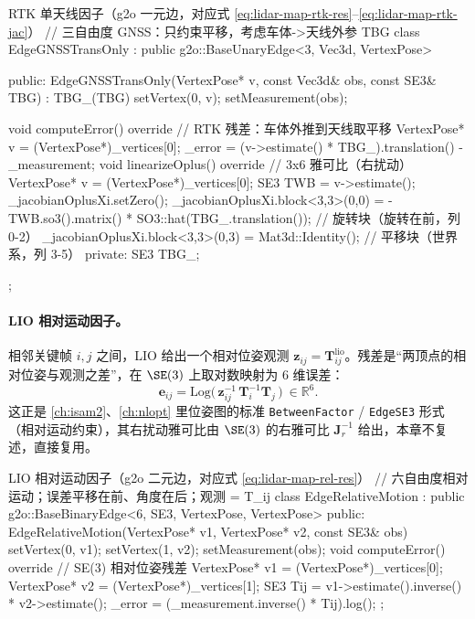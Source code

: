 \begin{codebox}[C++]{RTK 单天线因子（g2o 一元边，对应式 \ref{eq:lidar-map-rtk-res}--\ref{eq:lidar-map-rtk-jac}）}
// 三自由度 GNSS：只约束平移，考虑车体->天线外参 TBG
class EdgeGNSSTransOnly : public g2o::BaseUnaryEdge<3, Vec3d, VertexPose> {
 public:
  EdgeGNSSTransOnly(VertexPose* v, const Vec3d& obs, const SE3& TBG)
      : TBG_(TBG) { setVertex(0, v); setMeasurement(obs); }

  void computeError() override {                       // RTK 残差：车体外推到天线取平移
    VertexPose* v = (VertexPose*)_vertices[0];
    _error = (v->estimate() * TBG_).translation() - _measurement;
  }
  void linearizeOplus() override {                     // 3x6 雅可比（右扰动）
    VertexPose* v = (VertexPose*)_vertices[0];
    SE3 TWB = v->estimate();
    _jacobianOplusXi.setZero();
    _jacobianOplusXi.block<3,3>(0,0) = -TWB.so3().matrix() * SO3::hat(TBG_.translation()); // 旋转块（旋转在前，列 0-2）
    _jacobianOplusXi.block<3,3>(0,3) = Mat3d::Identity();                       // 平移块（世界系，列 3-5）
  }
 private:
  SE3 TBG_;
};
\end{codebox}

\paragraph{LIO 相对运动因子。}
相邻关键帧 $i,j$ 之间，LIO 给出一个相对位姿观测 $\mathbf{z}_{ij}=\mathbf{T}_{ij}^{\text{lio}}$。残差是“两顶点的相对位姿与观测之差”，在 $\SE(3)$ 上取对数映射为 $6$ 维误差\cite{gao2023slamad}：
\begin{equation}
\label{eq:lidar-map-rel-res}
\mathbf{e}_{ij}=\mathrm{Log}\!\Big(\,\mathbf{z}_{ij}^{-1}\,\mathbf{T}_i^{-1}\mathbf{T}_j\,\Big)\ \in\mathbb{R}^6 .
\end{equation}
这正是 \cref{ch:isam2}、\cref{ch:nlopt} 里位姿图的标准 \texttt{BetweenFactor} / \texttt{EdgeSE3} 形式（相对运动约束），其右扰动雅可比由 $\SE(3)$ 的右雅可比 $\mathbf{J}_r^{-1}$ 给出，本章不复述，直接复用。

\begin{codebox}[C++]{LIO 相对运动因子（g2o 二元边，对应式 \ref{eq:lidar-map-rel-res}）}
// 六自由度相对运动；误差平移在前、角度在后；观测 = T_ij
class EdgeRelativeMotion : public g2o::BaseBinaryEdge<6, SE3, VertexPose, VertexPose> {
 public:
  EdgeRelativeMotion(VertexPose* v1, VertexPose* v2, const SE3& obs) {
    setVertex(0, v1); setVertex(1, v2); setMeasurement(obs);
  }
  void computeError() override {                       // SE(3) 相对位姿残差
    VertexPose* v1 = (VertexPose*)_vertices[0];
    VertexPose* v2 = (VertexPose*)_vertices[1];
    SE3 Tij = v1->estimate().inverse() * v2->estimate();
    _error = (_measurement.inverse() * Tij).log();
  }
};
\end{codebox}

